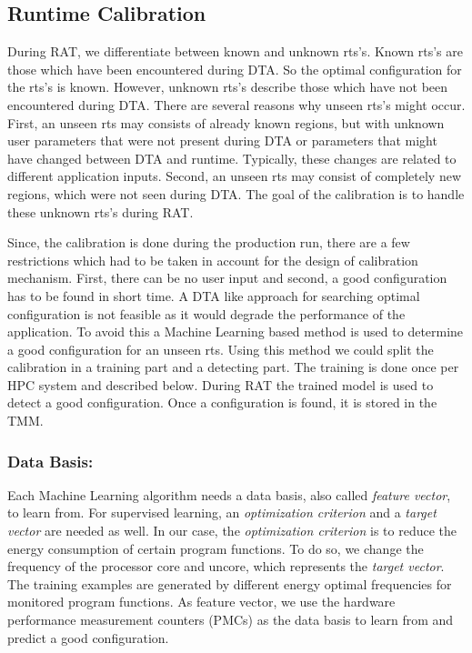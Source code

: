 \subsection{Runtime Calibration} \label{sec:calibration}
During RAT, we differentiate between known and unknown rts's. 
Known rts's are those which have been encountered during DTA. So the optimal configuration for the rts's is known. 
However, unknown rts's describe those which have not been encountered during DTA. 
There are several reasons why unseen rts's might occur. 
First, an unseen rts may consists of already known regions, but with unknown user parameters that were not present during DTA or parameters that might have changed between DTA and runtime. Typically, these changes are related to different application inputs. 
Second, an unseen rts may consist of completely new regions, which were not seen during DTA. 
The goal of the calibration is to handle these unknown rts's during RAT.

Since, the calibration is done during the production run, there are a few restrictions which had to be taken in account for the design of calibration mechanism. 
First, there can be no user input and 
second, a good configuration has to be found in short time. 
A DTA like approach for searching optimal configuration is not feasible as it would degrade the performance of the application.
To avoid this a Machine Learning based method is used to
determine a good configuration for an unseen rts. 
Using this method we could split the calibration in a training part and a detecting part. 
The training is done once per HPC system and described below. During RAT the trained model is used to detect a good configuration.
Once a configuration is found, it is stored in the TMM.

\subsubsection{Data Basis:}
Each Machine Learning algorithm needs a data basis, also called \textit{feature vector}, to learn from. 
For supervised learning, an \textit{optimization criterion} and a \textit{target vector} are needed as well. 
In our case, the \textit{optimization criterion} is to reduce the energy consumption of certain program functions. 
To do so, we change the frequency of the processor core and uncore, which represents the \textit{target vector}. 
The training examples are generated by different energy optimal frequencies for monitored program functions. 
As feature vector, we use the hardware performance measurement counters (PMCs) as the data basis to learn from and predict a
good configuration.

